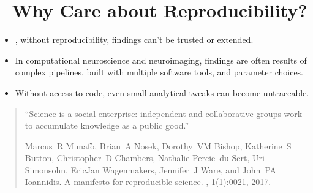 \documentclass[letterpaper,10pt,english]{jupyterBook}
\begin{document}
\section{🤨 Why Care about Reproducibility?}
\label{\detokenize{chapters/01/reproducibility-in-neuroimaging:why-care-about-reproducibility}}\begin{itemize}
\item {} 
\sphinxAtStartPar
{}, without reproducibility, findings can’t be trusted or extended.

\item {} 
\sphinxAtStartPar
In computational neuroscience and neuroimaging, findings are often results of complex pipelines, built with multiple software tools, and parameter choices.

\item {} 
\sphinxAtStartPar
Without access to code, even small analytical tweaks can become untraceable.

\end{itemize}
\begin{quote}

\sphinxAtStartPar
“Science is a social enterprise: independent and collaborative groups work to accumulate knowledge as a public good.”

\sphinxAtStartPar
{} %
\begin{footnote}[1]\sphinxAtStartFootnote
Marcus R Munafò, Brian A Nosek, Dorothy VM Bishop, Katherine S Button, Christopher D Chambers, Nathalie Percie du Sert, Uri Simonsohn, Eric\sphinxhyphen{}Jan Wagenmakers, Jennifer J Ware, and John PA Ioannidis. A manifesto for reproducible science. , 1(1):0021, 2017.
%
\end{footnote}
\end{quote}
\end{document}
